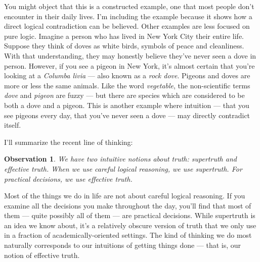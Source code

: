 \documentclass[11pt, oneside]{article}   	%
\newtheorem{obs}{Observation}
\begin{document}
You might object that this is a constructed example, one that most people don't
encounter in their daily lives. I'm including the example because it shows how
a direct logical contradiction can be believed.
Other examples are less focused on pure logic.
Imagine a person who has lived in New York City their entire
life. Suppose they think of doves as white birds, symbols of peace and
cleanliness. With that understanding, they may honestly believe they've
never seen a dove in person. However, if you see a pigeon in New York, it's
almost certain that you're looking at a {\em Columba livia} --- also known as a
{\em rock dove}.
Pigeons and doves are more or less the same animals.
Like the word {\em vegetable}, the non-scientific terms {\em dove} and
{\em pigeon} are fuzzy ---
but there are species which are considered to be both a dove and a pigeon.
This is another example
where intuition --- that you see pigeons every day, that you've never seen
a dove --- may directly contradict itself.

I'll summarize the recent line of thinking:
\begin{obs}\label{o10}
    We have two intuitive notions about truth: supertruth
    and effective truth.
    When we use careful logical reasoning, we use supertruth.
    For practical decisions, we use effective truth.
\end{obs}
Most of the things we do in life are not about careful logical reasoning. If you
examine all the decisions you make throughout
the day, you'll find that most of them --- quite possibly all of them --- 
are practical decisions.
While supertruth is an idea we know
about, it's a relatively obscure version of truth that we only use in a
fraction of academically-oriented settings.
The kind of thinking we do most naturally corresponds to our intuitions of
getting things done --- that is, our notion of effective truth.

\end{document}
